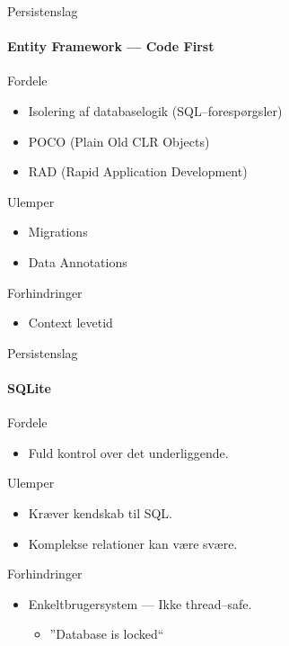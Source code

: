 \begin{frame}{Persistenslag}
  \framesubtitle{Entity Framework --- Code First}
  \begin{beamerboxesrounded}[upper=headerCol,lower=bodyCol,shadow=true]{Fordele}
    \begin{itemize}
      \item Isolering af databaselogik (SQL--forespørgsler)
      \item POCO (Plain Old CLR Objects)
      \item RAD (Rapid Application Development)
    \end{itemize}
  \end{beamerboxesrounded}
  \pause
  \begin{beamerboxesrounded}[upper=headerCol,lower=bodyCol,shadow=true]{Ulemper}
    \begin{itemize}
      \item Migrations
      \item Data Annotations
    \end{itemize}
  \end{beamerboxesrounded}
  \pause
  \begin{beamerboxesrounded}[upper=headerCol,lower=bodyCol,shadow=true]{Forhindringer}
    \begin{itemize}
      \item Context levetid
    \end{itemize}
  \end{beamerboxesrounded}
\end{frame}

\begin{frame}{Persistenslag}
  \framesubtitle{SQLite}
  \begin{beamerboxesrounded}[upper=headerCol,lower=bodyCol,shadow=true]{Fordele}
    \begin{itemize}
      \item Fuld kontrol over det underliggende.
    \end{itemize}
  \end{beamerboxesrounded}
  \pause
  \begin{beamerboxesrounded}[upper=headerCol,lower=bodyCol,shadow=true]{Ulemper}
    \begin{itemize}
      \item Kræver kendskab til SQL.
      \item Komplekse relationer kan være svære.
    \end{itemize}
  \end{beamerboxesrounded}
  \pause
  \begin{beamerboxesrounded}[upper=headerCol,lower=bodyCol,shadow=true]{Forhindringer}
    \begin{itemize}
      \item Enkeltbrugersystem --- Ikke thread--safe.
      \begin{itemize}
        \item ''Database is locked``
      \end{itemize}
    \end{itemize}
  \end{beamerboxesrounded}
\end{frame}

